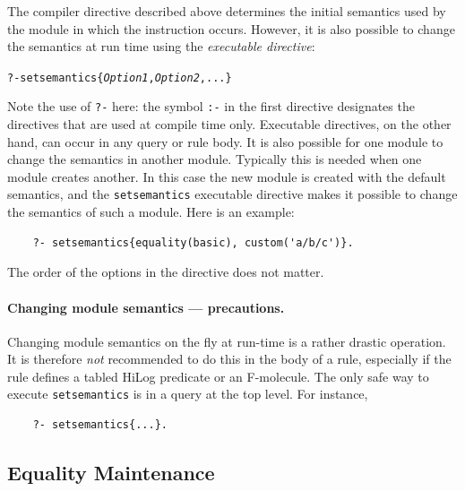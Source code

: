 \documentclass[11pt]{article}
\begin{document}
The compiler directive described above determines the initial semantics used
by the module in which the instruction occurs. However, it is also possible
to change the semantics at run time using the \emph{executable directive}:
\begin{alltt}
    ?- setsemantics\{\emph{Option1}, \emph{Option2}, ...\}
\end{alltt}
Note the use of {\tt ?-} here: the symbol {\tt :-} in the first directive
designates the directives that are used at compile time only.  Executable
directives, on the other hand, can occur in any query or rule body.  It is
also possible for one module to change the semantics in another module.
Typically this is needed when one module creates another. In this case the
new module is created with the default semantics, and the {\tt setsemantics}
executable directive makes it possible to change the semantics of such a
module. Here is an example:
\begin{verbatim}
    ?- setsemantics{equality(basic), custom('a/b/c')}.  
\end{verbatim}
The order of the options in the directive does not matter.

\paragraph{Changing module semantics --- precautions.}
Changing module semantics on the fly at run-time is a rather drastic operation.
It is therefore \emph{not} recommended to do this in the body of a rule,
especially if the rule defines a tabled HiLog predicate or an F-molecule.
The only safe way to execute {\tt setsemantics} is in a query at the top
level. For instance, 
  \begin{verbatim}
    ?- setsemantics{...}.
  \end{verbatim}


\subsection{Equality Maintenance}\label{sec-eqmaintain}
\end{document}
